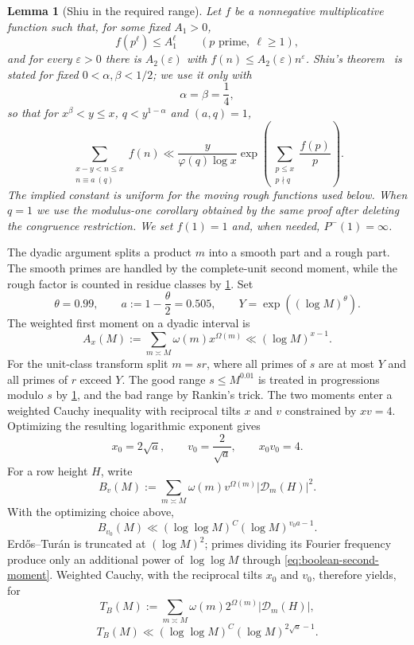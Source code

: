 \documentclass[11pt]{article}
\newtheorem{lemma}[lemma]{Lemma}
\theoremstyle{definition}
\theoremstyle{remark}
\newcommand{\Dcal}{\mathcal D}
\newcommand{\1}{\mathbf 1}
\newcommand{\Om}{\Omega}
\newcommand{\om}{\omega}
\newcommand{\ph}{\varphi}
\newcommand{\llog}{\log\log}
\begin{document}
\begin{lemma}[Shiu in the required range]\label{lem:shiu-required}
Let $f$ be a nonnegative multiplicative function such that, for some fixed
$A_1>0$,
\[
f(p^\ell)\le A_1^\ell\qquad(p\text{ prime},\ \ell\ge1),
\]
and for every $\varepsilon>0$ there is $A_2(\varepsilon)$ with
$f(n)\le A_2(\varepsilon)n^\varepsilon$.  Shiu's theorem~\cite{Shiu1980}
is stated for fixed $0<\alpha,\beta<1/2$; we use it only with
\[
\alpha=\beta=\frac14,
\]
so that for $x^\beta<y\le x$, $q<y^{1-\alpha}$ and $(a,q)=1$,
\begin{equation}\label{eq:shiu}
\sum_{\substack{x-y<n\le x\\n\equiv a\ (q)}}f(n)
 \ll
 \frac{y}{\ph(q)\log x}
 \exp\!\left(\sum_{\substack{p\le x\\p\nmid q}}\frac{f(p)}p\right).
\end{equation}
The implied constant is uniform for the moving rough functions used below.  When $q=1$ we use the modulus-one corollary obtained by the same proof after deleting the congruence restriction.  We set $f(1)=1$ and, when needed, $P^-(1)=\infty$.
\end{lemma}

The dyadic argument splits a product $m$ into a smooth part and a rough part.  The smooth primes are handled by the complete-unit second moment, while the rough factor is counted in residue classes by \cref{lem:shiu-required}.  Set
\[
\theta=0.99,\qquad a:=1-\frac\theta2=0.505,
\qquad Y=\exp((\log M)^\theta).
\]
The weighted first moment on a dyadic interval is
\begin{equation}\label{eq:Ax}
A_x(M):=\sum_{m\asymp M}\om(m)x^{\Om(m)}
 \ll (\log M)^{x-1}.
\end{equation}
For the unit-class transform split $m=sr$, where all primes of $s$ are at most $Y$ and all primes of $r$ exceed $Y$.  The good range $s\le M^{0.01}$ is treated in progressions modulo $s$ by \cref{lem:shiu-required}, and the bad range by Rankin's trick.  The two moments enter a weighted Cauchy inequality with reciprocal tilts $x$ and $v$ constrained by $xv=4$.  Optimizing the resulting logarithmic exponent gives
\[
x_0=2\sqrt a,
\qquad
v_0=\frac{2}{\sqrt a},
\qquad
x_0v_0=4.
\]
For a row height $H$, write
\[
B_v(M):=\sum_{m\asymp M}\om(m)v^{\Om(m)}|\Dcal_m(H)|^2.
\]
With the optimizing choice above,
\begin{equation}\label{eq:Bv}
B_{v_0}(M)\ll (\llog M)^C(\log M)^{v_0a-1}.
\end{equation}
Erd\H{o}s--Tur\'an is truncated at $(\log M)^2$; primes dividing its Fourier frequency produce only an additional power of $\llog M$ through \cref{eq:boolean-second-moment}.  Weighted Cauchy, with the reciprocal tilts $x_0$ and $v_0$, therefore yields, for
\[
T_B(M):=\sum_{m\asymp M}\om(m)2^{\Om(m)}|\Dcal_m(H)|,
\]
\begin{equation}\label{eq:boolean-dyadic}
T_B(M)\ll (\llog M)^C(\log M)^{2\sqrt a-1}.
\end{equation}
\end{document}
